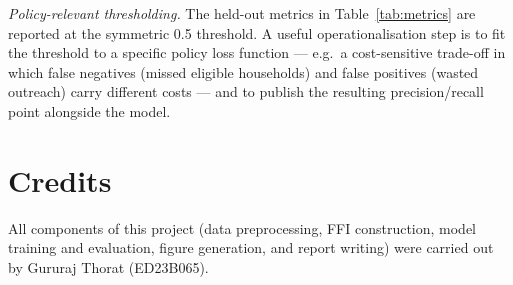 \documentclass[colorlinks,balance]{asmeconf}
\begin{document}
\textit{Policy-relevant thresholding.} The held-out metrics in Table~\ref{tab:metrics} are reported at the symmetric 0.5 threshold. A useful operationalisation step is to fit the threshold to a specific policy loss function --- e.g.\ a cost-sensitive trade-off in which false negatives (missed eligible households) and false positives (wasted outreach) carry different costs --- and to publish the resulting precision/recall point alongside the model.

\section*{Credits}
All components of this project (data preprocessing, FFI construction, model training and evaluation, figure generation, and report writing) were carried out by Gururaj Thorat (ED23B065).



\end{document}
